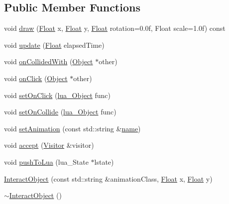\subsection*{Public Member Functions}
\begin{DoxyCompactItemize}
\item 
void \hyperlink{classZeta_1_1InteractObject_a1a9f0b7c74fb38466bf203896b994dba}{draw} (\hyperlink{namespaceZeta_a1e0a1265f9b3bd3075fb0fabd39088ba}{Float} x, \hyperlink{namespaceZeta_a1e0a1265f9b3bd3075fb0fabd39088ba}{Float} y, \hyperlink{namespaceZeta_a1e0a1265f9b3bd3075fb0fabd39088ba}{Float} rotation=0.\+0f, Float scale=1.\+0f) const 
\item 
void \hyperlink{classZeta_1_1InteractObject_ac5db80cfe9420736ddcbc84ab2733137}{update} (\hyperlink{namespaceZeta_a1e0a1265f9b3bd3075fb0fabd39088ba}{Float} elapsed\+Time)
\item 
void \hyperlink{classZeta_1_1InteractObject_a4284ede98266a3837f19dda5472e1c13}{on\+Collided\+With} (\hyperlink{classZeta_1_1Object}{Object} $\ast$other)
\item 
void \hyperlink{classZeta_1_1InteractObject_af8c542cd9c095794be5ea46a284a4125}{on\+Click} (\hyperlink{classZeta_1_1Object}{Object} $\ast$other)
\item 
void \hyperlink{classZeta_1_1InteractObject_ae9b7d8b2ace39b714917766a0bab4809}{set\+On\+Click} (\hyperlink{ZetaConfig_8hpp_ae7be32b73848041a60f2412f72bbb221}{lua\+\_\+\+Object} func)
\item 
void \hyperlink{classZeta_1_1InteractObject_a5d6bb28ba0fd9791e16b95b3449ee445}{set\+On\+Collide} (\hyperlink{ZetaConfig_8hpp_ae7be32b73848041a60f2412f72bbb221}{lua\+\_\+\+Object} func)
\item 
void \hyperlink{classZeta_1_1InteractObject_ae21efe5065e6bb8eb3e01a07cb9f007f}{set\+Animation} (const std\+::string \&\hyperlink{classZeta_1_1Object_ace4ef81b7c300e0a170292e9888cd66f}{name})
\item 
void \hyperlink{classZeta_1_1InteractObject_a4288d930f580cd6e4ddf6098e4b83898}{accept} (\hyperlink{classZeta_1_1Visitor}{Visitor} \&visitor)
\item 
void \hyperlink{classZeta_1_1InteractObject_ac422353b524575f4be794623631debaf}{push\+To\+Lua} (lua\+\_\+\+State $\ast$lstate)
\item 
\hyperlink{classZeta_1_1InteractObject_a7afbf3132da1a38e0d7bedb560eb1571}{Interact\+Object} (const std\+::string \&animation\+Class, \hyperlink{namespaceZeta_a1e0a1265f9b3bd3075fb0fabd39088ba}{Float} x, \hyperlink{namespaceZeta_a1e0a1265f9b3bd3075fb0fabd39088ba}{Float} y)
\item 
\hyperlink{classZeta_1_1InteractObject_a36a29713aa96c5a382d3cd7076e12199}{$\sim$\+Interact\+Object} ()
\end{DoxyCompactItemize}
